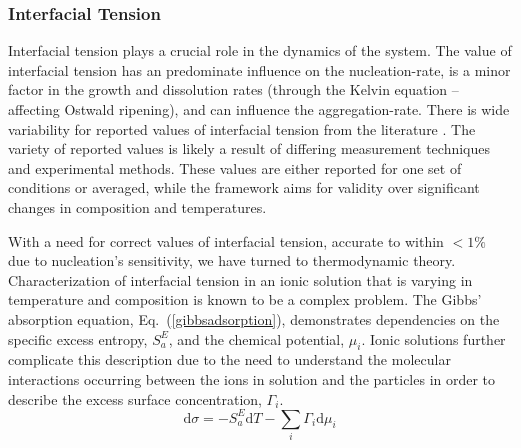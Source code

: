 \documentclass[preprint,3p,a4paper,times,12pt,authoryear]{elsarticle}
\begin{document}
\subsubsection{Interfacial Tension}
\label{interfacial_tension}
Interfacial tension plays a crucial role in the dynamics of the system.  The value of interfacial tension has an predominate influence on the nucleation-rate, is a minor factor in the growth and dissolution rates (through the Kelvin equation -- affecting Ostwald ripening), and can influence the aggregation-rate. 
There is wide variability for reported values of interfacial tension from the literature \citep{Goujon1976,Sohnel1982,Christoffersen1990,Nancollas1999,Donnet2009}. 
The variety of reported values is likely a result of differing measurement techniques and experimental methods.  These values are either reported for one set of conditions or averaged, while the framework aims for validity over significant changes in composition and temperatures.

With a need for correct values of interfacial tension, accurate to within $<1\%$ due to nucleation's sensitivity, we have turned to thermodynamic theory. Characterization of interfacial tension in an ionic solution that is varying in temperature and composition is known to be a complex problem. The Gibbs' absorption equation, Eq.~(\ref{gibbsadsorption}), demonstrates dependencies on the specific excess entropy, $S_a^E$, and the chemical potential, $\mu_i$. Ionic solutions further complicate this description due to the need to understand the molecular interactions occurring between the ions in solution and the particles in order to describe the excess surface concentration, $\Gamma_i$.
\begin{equation} \label{gibbsadsorption}
\mathrm{d} \sigma = -S_a^E \mathrm{d} T - \sum_i \Gamma_i \mathrm{d} \mu_i 
\end{equation}
\end{document}
